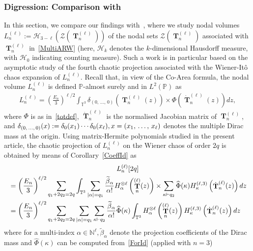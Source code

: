 \documentclass[10pt]{amsart}
\theoremstyle{definition}\newtheorem{defi}[theo]{Definition}\newtheorem{rema}[theo]{Remark}\newtheorem{exam}[theo]{Example}\newtheorem{exem}[theo]{Example}\newtheorem{nota}[theo]{Notation}
\DeclareMathOperator{\bT}{\mathbf{T}}
\newcommand{\clH}{\mathcal{H}}
\newcommand{\clZ}{\mathcal{Z}}
\newcommand{\N}{\mathbb{N}}
\newcommand{\T}{\mathbb{T}^3}
\newcommand{\Prob}{\mathbb{P}}
\let\oldtilde\tilde
\renewcommand*{\tilde}[1]{\mathchoice{\widetilde{#1}}{\widetilde{#1}}{\oldtilde{#1}}{\oldtilde{#1}}}
\begin{document}
\subsubsection{Digression: Comparison with~\cite{Not20}}\label{Nodal}
In this section, we compare our findings with~\cite{Not20}, where we study nodal volumes $L_n^{(\ell)}:=\clH_{3-\ell}(\clZ(\bT_n^{(\ell)}))$ of the nodal sets $\clZ(\bT_n^{(\ell)})$ associated with $\bT_n^{(\ell)}$ in~\eqref{MultiARW} (here, $\clH_k$ denotes the $k$-dimensional Hausdorff measure, with $\clH_0$ indicating counting measure). Such a work is in particular based on the asymptotic study of the fourth chaotic projection associated with the Wiener-Itô chaos expansion of $L_n^{(\ell)}$. Recall that, in view of the Co-Area formula, the nodal volume $L_n^{(\ell)}$ is defined $\Prob$-almost surely and in $L^2(\Prob)$ as
\begin{gather}\label{VolZ}
L_{n}^{(\ell)}= \left(\frac{E_n}{3}\right)^{\ell/2}\int_{\T}
\delta_{(0,\,\ldots,\,0)}\left(\bT_n^{(\ell)}(z)\right)
\times \Phi\left(\dot{\bT}_n^{(\ell)}(z)\right) dz,
\end{gather}
where $\Phi$ is as in~\eqref{totdef}, $\dot{\bT}_n^{(\ell)}$ is the normalised Jacobian matrix of $\bT_n^{(\ell)}$, and $\delta_{(0,\,\ldots,\,0)}(x)\linebreak:=\delta_0(x_1) \cdots \delta_0(x_{\ell}), x=(x_1,\,\ldots,\,x_{\ell})$ denotes the multiple Dirac mass at the origin. Using matrix-Hermite polynomials studied in the present article, the chaotic projection of $L_n^{(\ell)}$ on the Wiener chaos of order $2q$ is obtained by means of Corollary~\ref{CoeffId} as
\begin{multline}\label{c2q}
L_{n}^{(\ell)}[2q]\\
\begin{aligned}
&= \left(\frac{E_n}{3}\right)^{\ell/2}\sum_{q_1+2q_2=2q} \int_{\T}
\sum_{|\alpha|=q_1} \frac{\tilde{\beta}_{\alpha}}{\alpha!} H_{\alpha}^{\otimes \ell}\left(\bT_n^{(\ell)}(z)\right)
\times \sum_{\kappa \vdash q_2} \widehat{\Phi}(\kappa) H_{\kappa}^{(\ell,3)}\left(\dot{\bT}_n^{(\ell)}(z)\right) dz\\
&= \left(\frac{E_n}{3}\right)^{\ell/2}\sum_{q_1+2q_2=2q}
\sum_{|\alpha|=q_1} \sum_{\kappa \vdash q_2}
\frac{\tilde{\beta}_{\alpha}}{\alpha!}\widehat{\Phi}(\kappa) \int_{\T} H_{\alpha}^{\otimes \ell}\left(\bT_n^{(\ell)}(z)\right) H_{\kappa}^{(\ell,3)}\left(\dot{\bT}_n^{(\ell)}(z)\right) dz 
\end{aligned}
\end{multline}
where for a multi-index $\alpha\in \N^{\ell}, \widetilde{\beta}_{\alpha}$ denote the projection coefficients of the Dirac mass and $\widehat{\Phi}(\kappa)$ can be computed from~\eqref{ForId} (applied with $n=3$)
\end{document}

